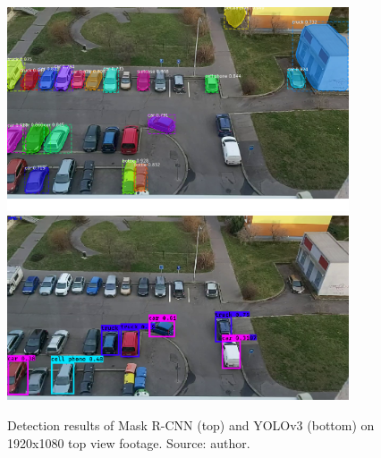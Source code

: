 \documentclass[thesis=M,english]{FITthesis}[2019/03/06]
\begin{document}
\begin{figure}[!htb]
	\centering
	\includegraphics[width=0.90\textwidth]{imgs/mask-hd.png}
	\includegraphics[width=0.90\textwidth]{imgs/yolo-hd.png}
	\caption{Detection results of Mask R-CNN (top) and YOLOv3 (bottom) on 1920x1080 top view footage. Source: author.}
	\label{label:comparison_hd}
\end{figure}
\end{document}
